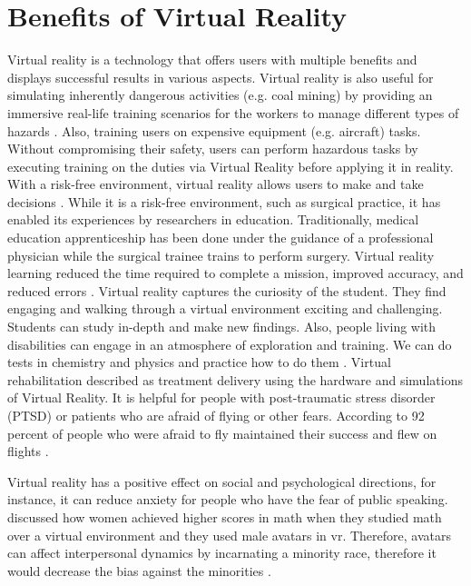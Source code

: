   
\section{Benefits of Virtual Reality}

Virtual reality is a technology that offers users with multiple benefits and displays successful results in various aspects. Virtual reality is also useful for simulating inherently dangerous activities (e.g. coal mining) by providing an immersive real-life training scenarios for the workers to manage different types of hazards \citep{VanWyk2009VirtualIndustry}. Also, training users on expensive equipment (e.g. aircraft) tasks. Without compromising their safety, users can perform hazardous tasks by executing training on the duties via Virtual Reality before applying it in reality. With a risk-free environment, virtual reality allows users to make and take decisions \citep{Aguinas2004}. While it is a risk-free environment, such as surgical practice, it has enabled its experiences by researchers in education. Traditionally, medical education apprenticeship has been done under the guidance of a professional physician while the surgical trainee trains to perform surgery. Virtual reality learning reduced the time required to complete a mission, improved accuracy, and reduced errors \citep{Ks2009}. Virtual reality captures the curiosity of the student. They find engaging and walking through a virtual environment exciting and challenging. Students can study in-depth and make new findings. Also, people living with disabilities can engage in an atmosphere of exploration and training. We can do tests in chemistry and physics and practice how to do them \citep{Pantelidis2010}. Virtual rehabilitation described as treatment delivery using the hardware and simulations of Virtual Reality. It is helpful for people with post-traumatic stress disorder (PTSD) or patients who are afraid of flying or other fears. According to 
\cite{Burdea2003} 92 percent of people who were afraid to fly maintained their success and flew on flights \citep{Burdea2003}.

Virtual reality has a positive effect on social and psychological directions, for instance, it can reduce anxiety for people who have the fear of public speaking. \cite{Chang2019StereotypeOutcomes} discussed how women achieved higher scores in math when they studied math over a virtual environment and they used male avatars in \acrshort{vr}. Therefore, avatars can affect interpersonal dynamics by incarnating a minority race, therefore it would decrease the bias against the minorities \citep{Markowitz2018ImmersiveChange, Chang2019StereotypeOutcomes}.   

